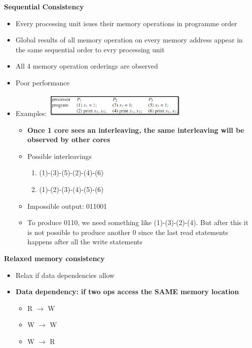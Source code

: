 \documentclass[10pt, landscape]{article}
\begin{document}
\begin{multicols}{4}
\textbf{Sequential Consistency}
\begin{itemize}
    \item Every processing unit isues their memory operations in programme order 
    \item Global results of all memory operation on every memory address appear in the same sequential order to evry processing unit
    \item All 4 memory operation orderings are observed
    \item Poor performance
    \item Examples: 
    \includegraphics*[width=7cm]{memory_model_eg.png}
    \begin{itemize}
        \item \textbf{Once 1 core sees an interleaving, the same interleaving will be observed by other cores}
        \item Possible interleavings 
        \begin{enumerate}
            \item (1)-(3)-(5)-(2)-(4)-(6) 
            \item (1)-(2)-(3)-(4)-(5)-(6) 
        \end{enumerate} 
        \item Impossible output: 011001
        \item To produce 0110, we need something like (1)-(3)-(2)-(4). But after this it is not possible to produce another 0 since the last read statements happens after all the write statements
    \end{itemize}
\end{itemize}

\textbf{Relaxed memory consistency}
\begin{itemize}
    \item Relax if data dependencies allow 
    \item \textbf{Data dependency: if two ops access the SAME memory location}
    \begin{itemize}
        \item R $\rightarrow$ W
        \item W $\rightarrow$ W
        \item W $\rightarrow$ R 
    \end{itemize}
\end{itemize}


\end{multicols}
\end{document}
